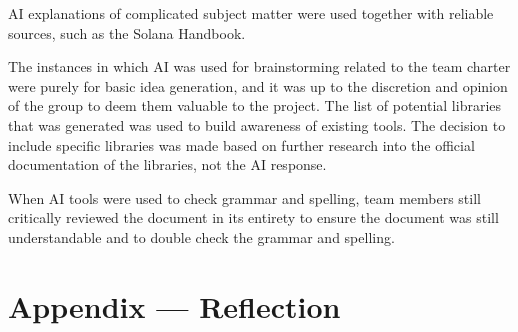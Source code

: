 \documentclass{article}
\begin{document}
AI explanations of complicated subject matter were used together with reliable sources, such as the Solana Handbook.

The instances in which AI was used for brainstorming related to the team charter were purely for basic idea generation, and it was up to the discretion and opinion of the group to deem them valuable to the project. The list of potential libraries that was generated was used to build awareness of existing tools. The decision to include specific libraries was made based on further research into the official documentation of the libraries, not the AI response.

When AI tools were used to check grammar and spelling, team members still critically reviewed the document in its entirety to ensure the document was still understandable and to double check the grammar and spelling.

\newpage{}

\section*{Appendix --- Reflection}


\end{document}
